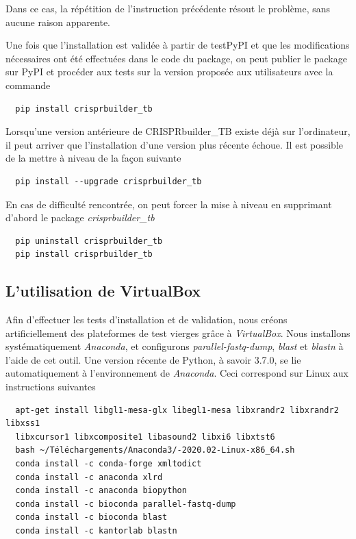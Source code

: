 \documentclass[twoside,a4paper,11pt,frenchb,openany]{report}
\begin{document}
Dans ce cas, la répétition de l'instruction précédente résout le problème, sans aucune raison apparente.

Une fois que l'installation est validée à partir de testPyPI et que les modifications nécessaires ont été effectuées dans le code du package, on peut publier le package sur PyPI et procéder aux tests sur la version proposée aux utilisateurs avec la commande

\begin{verbatim}
  pip install crisprbuilder_tb
\end{verbatim}

Lorsqu'une version antérieure de CRISPRbuilder\_TB existe déjà sur l'ordinateur, il peut arriver que l'installation d'une version plus récente échoue. Il est possible de la mettre à niveau de la façon suivante
\begin{verbatim}
  pip install --upgrade crisprbuilder_tb
\end{verbatim}

En cas de difficulté rencontrée, on peut forcer la mise à niveau en supprimant d'abord le package \textit{crisprbuilder\_tb}
\begin{verbatim}
  pip uninstall crisprbuilder_tb
  pip install crisprbuilder_tb
\end{verbatim}





\subsection{L'utilisation de VirtualBox}

Afin d'effectuer les tests d'installation et de validation, nous créons artificiellement des plateformes de test vierges grâce à \textit{VirtualBox}. Nous installons systématiquement \textit{Anaconda}, et configurons \textit{parallel-fastq-dump}, \textit{blast} et \textit{blastn} à l'aide de cet outil. Une version récente de Python, à savoir 3.7.0, se lie automatiquement à l'environnement de \textit{Anaconda}. Ceci correspond sur Linux aux instructions suivantes

\begin{verbatim}
  apt-get install libgl1-mesa-glx libegl1-mesa libxrandr2 libxrandr2 libxss1 
  libxcursor1 libxcomposite1 libasound2 libxi6 libxtst6
  bash ~/Téléchargements/Anaconda3/-2020.02-Linux-x86_64.sh
  conda install -c conda-forge xmltodict
  conda install -c anaconda xlrd
  conda install -c anaconda biopython
  conda install -c bioconda parallel-fastq-dump
  conda install -c bioconda blast
  conda install -c kantorlab blastn
\end{verbatim}
\end{document}
